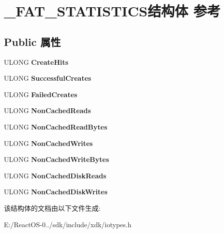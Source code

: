 \hypertarget{struct___f_a_t___s_t_a_t_i_s_t_i_c_s}{}\section{\+\_\+\+F\+A\+T\+\_\+\+S\+T\+A\+T\+I\+S\+T\+I\+C\+S结构体 参考}
\label{struct___f_a_t___s_t_a_t_i_s_t_i_c_s}
\subsection*{Public 属性}
\begin{DoxyCompactItemize}
\item 
\mbox{\label{struct___f_a_t___s_t_a_t_i_s_t_i_c_s_a53709ebf130e767f2827836556f0d4fc}} 
U\+L\+O\+NG {\bfseries Create\+Hits}
\item 
\mbox{\label{struct___f_a_t___s_t_a_t_i_s_t_i_c_s_a10d7973ec3ce28295b5800e4c024a206}} 
U\+L\+O\+NG {\bfseries Successful\+Creates}
\item 
\mbox{\label{struct___f_a_t___s_t_a_t_i_s_t_i_c_s_a8da0aa93d03f29b89a5273d05269b882}} 
U\+L\+O\+NG {\bfseries Failed\+Creates}
\item 
\mbox{\label{struct___f_a_t___s_t_a_t_i_s_t_i_c_s_aa5741982ed60f3c4bd69088e3ea882e4}} 
U\+L\+O\+NG {\bfseries Non\+Cached\+Reads}
\item 
\mbox{\label{struct___f_a_t___s_t_a_t_i_s_t_i_c_s_a587575f7ff015a20f555501432bdb035}} 
U\+L\+O\+NG {\bfseries Non\+Cached\+Read\+Bytes}
\item 
\mbox{\label{struct___f_a_t___s_t_a_t_i_s_t_i_c_s_ae0fa52854029eea86609a99f40564099}} 
U\+L\+O\+NG {\bfseries Non\+Cached\+Writes}
\item 
\mbox{\label{struct___f_a_t___s_t_a_t_i_s_t_i_c_s_a9789d78a1b0ea854a3fa4be4c259e646}} 
U\+L\+O\+NG {\bfseries Non\+Cached\+Write\+Bytes}
\item 
\mbox{\label{struct___f_a_t___s_t_a_t_i_s_t_i_c_s_ac12cf665213ecfc2ac022c51a4d2bd5d}} 
U\+L\+O\+NG {\bfseries Non\+Cached\+Disk\+Reads}
\item 
\mbox{\label{struct___f_a_t___s_t_a_t_i_s_t_i_c_s_a7c6918e76786d59213557dd0dd0fe484}} 
U\+L\+O\+NG {\bfseries Non\+Cached\+Disk\+Writes}
\end{DoxyCompactItemize}


该结构体的文档由以下文件生成\+:\begin{DoxyCompactItemize}
\item 
E\+:/\+React\+O\+S-\/0../sdk/include/xdk/iotypes.\+h\end{DoxyCompactItemize}
